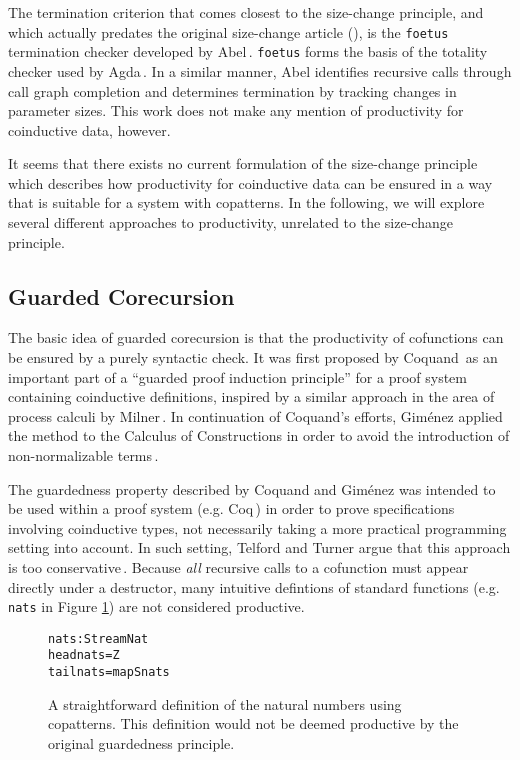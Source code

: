 The termination criterion that comes closest to the size-change principle, and which actually predates the original size-change article (\citep{LeeJones01SizeChange}), is the \texttt{foetus} termination checker developed by Abel\,\citep{Abel98foetus}. \texttt{foetus} forms the basis of the totality checker used by Agda\,\citep{Norell:thesis}. In a similar manner, Abel identifies recursive calls through call graph completion and determines termination by tracking changes in parameter sizes. This work does not make any mention of productivity for coinductive data, however.

It seems that there exists no current formulation of the size-change principle which describes how productivity for coinductive data can be ensured in a way that is suitable for a system with copatterns. In the following, we will explore several different approaches to productivity, unrelated to the size-change principle.

\subsection{Guarded Corecursion}
The basic idea of guarded corecursion is that the productivity of cofunctions can be ensured by a purely syntactic check. It was first proposed by Coquand\,\citep{Coquand94} as an important part of a ``guarded proof induction principle'' for a proof system containing coinductive definitions, inspired by a similar approach in the area of process calculi by Milner\,\citep{Milner82}. In continuation of Coquand's efforts, Gim\'{e}nez applied the method to the Calculus of Constructions in order to avoid the introduction of non-normalizable terms\,\citep{Gimenez95}. 

The guardedness property described by Coquand and Gim\'{e}nez was intended to be used within a proof system (e.g. Coq\,\citep{Coq:manual}) in order to prove specifications involving coinductive types, not necessarily taking a more practical programming setting into account. In such setting, Telford and Turner argue that this approach is too conservative\,\citep{Telford98ensuringthe}. Because \emph{all} recursive calls to a cofunction must appear directly under a destructor, many intuitive defintions of standard functions (e.g. \texttt{nats} in Figure \ref{fig:nats}) are not considered productive.

\begin{figure}
\begin{alltt}
                      nats : Stream Nat
                      head nats = Z
                      tail nats = map S nats
\end{alltt}
\caption{A straightforward definition of the natural numbers using copatterns. This definition would not be deemed productive by the original guardedness principle.}
\label{fig:nats}
\end{figure}

